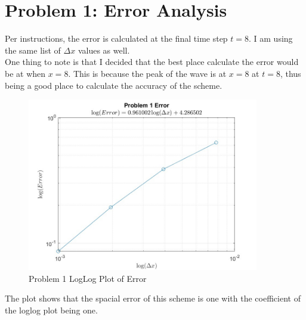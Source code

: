 \documentclass[12pt,letterpaper]{article}
\begin{document}
\newpage


\section*{Problem 1: Error Analysis}

Per instructions, the error is calculated at the final time step $t=8$. I am using the same list of $\Delta x$ values as well.
\\

One thing to note is that I decided that the best place calculate the error would be at when $x = 8$. This is because the peak of the wave is at $x = 8$ at $t = 8$, thus being a good place to calculate the accuracy of the scheme.


\begin{figure}[!h]
    \centering
    \includegraphics[width = 0.9\textwidth]{Problem1_Error.jpg}

    \caption{Problem 1 LogLog Plot of Error}

\end{figure}

The plot shows that the spacial error of this scheme is one with the coefficient of the loglog plot being one.


\newpage
\end{document}
